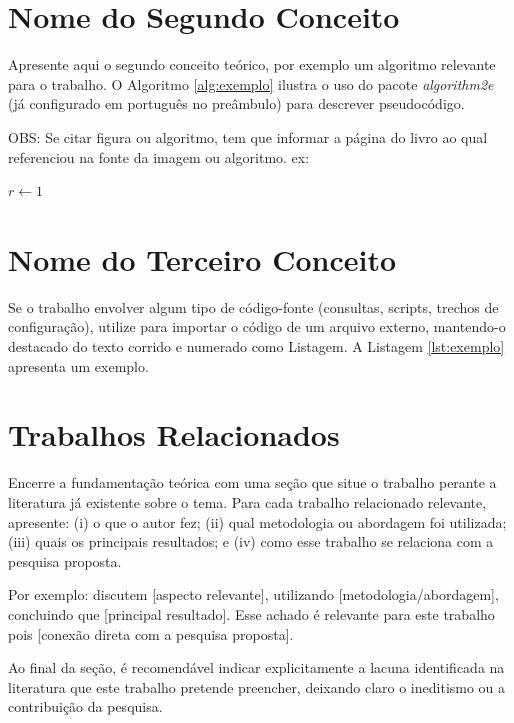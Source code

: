 \section{Nome do Segundo Conceito}

Apresente aqui o segundo conceito teórico, por exemplo um algoritmo relevante para o trabalho. O Algoritmo \ref{alg:exemplo} ilustra o uso do pacote \textit{algorithm2e} (já configurado em português no preâmbulo) para descrever pseudocódigo.

OBS: Se citar figura ou algoritmo, tem que informar a página do livro ao qual referenciou na fonte da imagem ou algoritmo. ex:

\begin{algorithm}[H]
    \caption{Nome do algoritmo de exemplo}
    \label{alg:exemplo}
    $r \gets 1$\;
    \;
\end{algorithm}

\section{Nome do Terceiro Conceito}

Se o trabalho envolver algum tipo de código-fonte (consultas, scripts, trechos de configuração), utilize \verb|| para importar o código de um arquivo externo, mantendo-o destacado do texto corrido e numerado como Listagem. A Listagem \ref{lst:exemplo} apresenta um exemplo.


\vspace{-0.4cm}

\section{Trabalhos Relacionados}

Encerre a fundamentação teórica com uma seção que situe o trabalho perante a literatura já existente sobre o tema. Para cada trabalho relacionado relevante, apresente: (i) o que o autor fez; (ii) qual metodologia ou abordagem foi utilizada; (iii) quais os principais resultados; e (iv) como esse trabalho se relaciona com a pesquisa proposta.

Por exemplo:  discutem [aspecto relevante], utilizando [metodologia/abordagem], concluindo que [principal resultado]. Esse achado é relevante para este trabalho pois [conexão direta com a pesquisa proposta].

Ao final da seção, é recomendável indicar explicitamente a lacuna identificada na literatura que este trabalho pretende preencher, deixando claro o ineditismo ou a contribuição da pesquisa.
